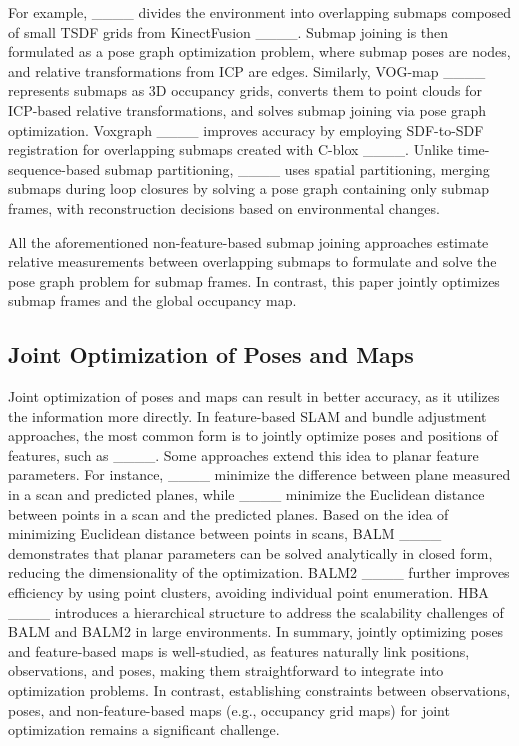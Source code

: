 For example, ____ divides the environment into overlapping submaps composed of small TSDF grids from KinectFusion ____. Submap joining is then formulated as a pose graph optimization problem, where submap poses are nodes, and relative transformations from ICP are edges. Similarly, VOG-map ____ represents submaps as 3D occupancy grids, converts them to point clouds for ICP-based relative transformations, and solves submap joining via pose graph optimization. Voxgraph ____ improves accuracy by employing SDF-to-SDF registration for overlapping submaps created with C-blox ____. Unlike time-sequence-based submap partitioning, ____ uses spatial partitioning, merging submaps during loop closures by solving a pose graph containing only submap frames, with reconstruction decisions based on environmental changes.

All the aforementioned non-feature-based submap joining approaches estimate relative measurements between overlapping submaps to formulate and solve the pose graph problem for submap frames. In contrast, this paper jointly optimizes submap frames and the global occupancy map.

\subsection{Joint Optimization of Poses and Maps}
Joint optimization of poses and maps can result in better accuracy, as it utilizes the information more directly. In feature-based SLAM and bundle adjustment approaches, the most common form is to jointly optimize poses and positions of features, such as ____. Some approaches extend this idea to planar feature parameters. For instance, ____ minimize the difference between plane measured in a scan and predicted planes, while ____ minimize the Euclidean distance between points in a scan and the predicted planes. Based on the idea of minimizing Euclidean distance between points in scans, BALM ____ demonstrates that planar parameters can be solved analytically in closed form, reducing the dimensionality of the optimization. BALM2 ____ further improves efficiency by using point clusters, avoiding individual point enumeration. HBA ____ introduces a hierarchical structure to address the scalability challenges of BALM and BALM2 in large environments. In summary, jointly optimizing poses and feature-based maps is well-studied, as features naturally link positions, observations, and poses, making them straightforward to integrate into optimization problems. In contrast, establishing constraints between observations, poses, and non-feature-based maps (e.g., occupancy grid maps) for joint optimization remains a significant challenge.




